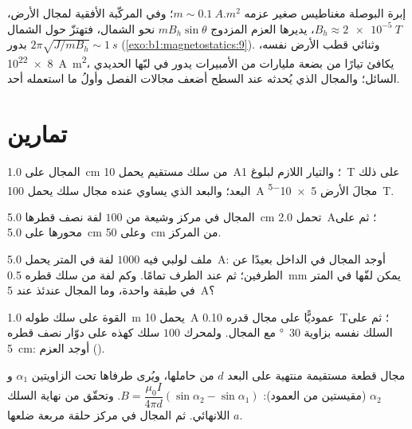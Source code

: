 \begin{example}\label{ex:b1:magnetostatics:compass}
إبرة البوصلة مغناطيس صغير عزمه $m \sim \qty{0.1}{A.m^2}$؛ وفي
المركّبة الأفقية لمجال الأرض، $B_h \approx \qty{2e-5}{T}$، يديرها
العزم المزدوج $mB_h\sin\theta$ نحو الشمال، فتهتزّ حول الشمال بدور
$2\pi\sqrt{J/mB_h} \sim \qty{1}{s}$ (\cref{exo:b1:magnetostatics:9}).
وثنائي قطب الأرض نفسه، \qty{8e22}{A.m^2}، يكافئ تيارًا من
بضعة مليارات من الأمبيرات يدور في لبّها الحديدي السائل؛ والمجال الذي
يُحدثه عند السطح أضعف مجالات الفصل وأولُ ما استعمله
أحد.
\end{example}

\section{تمارين}

\begin{exercise}[$\star$]\label{exo:b1:magnetostatics:1}
المجال على \qty{1.0}{cm} من سلك مستقيم يحمل \qty{10}{A}؛ والتيار
اللازم لبلوغ \qty{1}{T} على ذلك البعد؛ والبعد الذي يساوي عنده مجال سلك
يحمل \qty{100}{A} مجالَ الأرض \qty{5e-5}{T}.
\end{exercise}

\begin{exercise}[$\star$]\label{exo:b1:magnetostatics:2}
المجال في مركز وشيعة من $100$ لفة نصف قطرها \qty{5.0}{cm}
تحمل \qty{2.0}{A}؛ ثم على محورها على \qty{5.0}{cm} وعلى \qty{50}{cm}
من المركز.
\end{exercise}

\begin{exercise}[$\star$]\label{exo:b1:magnetostatics:3}
ملف لولبي فيه $1000$ لفة في المتر يحمل \qty{5.0}{A}: أوجد المجال في الداخل
بعيدًا عن الطرفين؛ ثم عند الطرف تمامًا. وكم لفة من سلك قطره \qty{0.5}{mm}
يمكن لفّها في المتر في طبقة واحدة، وما المجال عندئذ عند
\qty{5}{A}؟
\end{exercise}

\begin{exercise}[$\star$]\label{exo:b1:magnetostatics:4}
القوة على سلك طوله \qty{1.0}{m} يحمل \qty{10}{A} عموديًّا على مجال
قدره \qty{0.10}{T}؛ ثم على السلك نفسه بزاوية \qty{30}{\degree} مع المجال.
ولمحرك $100$ سلك كهذه على دوّار نصف قطره \qty{5}{cm}: أوجد العزم
().
\end{exercise}

\begin{exercise}[$\star\star$]\label{exo:b1:magnetostatics:5}
مجال قطعة مستقيمة منتهية على البعد $d$ من حاملها، ويُرى
طرفاها تحت الزاويتين $\alpha_1$ و $\alpha_2$ (مقيستين من
العمود): $B = \dfrac{\mu_0I}{4\pi d}(\sin\alpha_2 - \sin\alpha_1)$. وتحقّق
من نهاية السلك اللانهائي. ثم المجال في مركز حلقة مربعة ضلعها
$a$.
\end{exercise}

